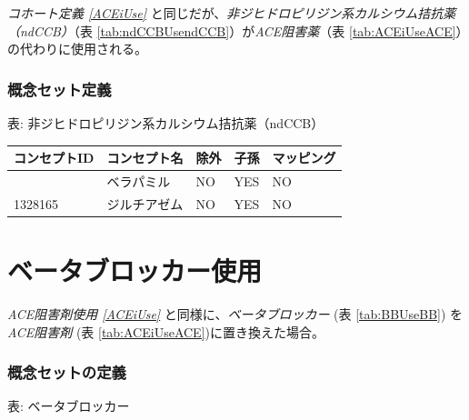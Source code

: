 \documentclass[
  11pt]{book}
\theoremstyle{definition}
\theoremstyle{definition}
\theoremstyle{definition}
\theoremstyle{definition}
\theoremstyle{remark}
\begin{document}
\emph{コホート定義 \ref{ACEiUse}} と同じだが、\emph{非ジヒドロピリジン系カルシウム拮抗薬（ndCCB）}（表 \ref{tab:ndCCBUsendCCB}）が\emph{ACE阻害薬}（表 \ref{tab:ACEiUseACE}）の代わりに使用される。

\subsubsection*{概念セット定義}\label{ux6982ux5ff5ux30bbux30c3ux30c8ux5b9aux7fa9-5}

表: \label{tab:ndCCBUsendCCB} 非ジヒドロピリジン系カルシウム拮抗薬（ndCCB）

\begin{longtable}[]{@{}lllll@{}}
\toprule\noalign{}
コンセプトID & コンセプト名 & 除外 & 子孫 & マッピング \\
\midrule\noalign{}
\endhead
\bottomrule\noalign{}
\endlastfoot
1307863 & ベラパミル & NO & YES & NO \\
1328165 & ジルチアゼム & NO & YES & NO \\
\end{longtable}

\section{ベータブロッカー使用}\label{BBUse}

\emph{ACE阻害剤使用 \ref{ACEiUse}} と同様に、\emph{ベータブロッカー} (表 \ref{tab:BBUseBB}) を \emph{ACE阻害剤} (表 \ref{tab:ACEiUseACE})に置き換えた場合。

\subsubsection*{概念セットの定義}\label{ux6982ux5ff5ux30bbux30c3ux30c8ux306eux5b9aux7fa9-2}

表: \label{tab:BBUseBB} ベータブロッカー
\end{document}
